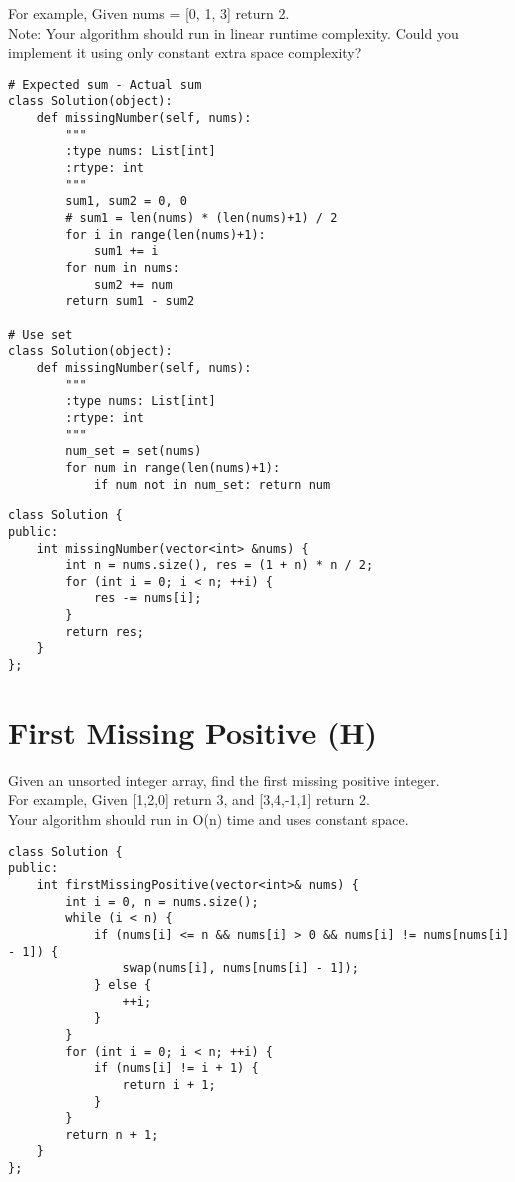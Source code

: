 For example, 
Given nums = [0, 1, 3] return 2.\\

Note:
Your algorithm should run in linear runtime complexity. Could you implement it using only constant extra space complexity? \\

\begin{lstlisting}
# Expected sum - Actual sum
class Solution(object):
    def missingNumber(self, nums):
        """
        :type nums: List[int]
        :rtype: int
        """
        sum1, sum2 = 0, 0
        # sum1 = len(nums) * (len(nums)+1) / 2
        for i in range(len(nums)+1):
            sum1 += i
        for num in nums:
            sum2 += num
        return sum1 - sum2

# Use set
class Solution(object):
    def missingNumber(self, nums):
        """
        :type nums: List[int]
        :rtype: int
        """
        num_set = set(nums)
        for num in range(len(nums)+1):
            if num not in num_set: return num
\end{lstlisting}        

\begin{lstlisting}
class Solution {
public:
    int missingNumber(vector<int> &nums) {
        int n = nums.size(), res = (1 + n) * n / 2;
        for (int i = 0; i < n; ++i) {
            res -= nums[i];
        }
        return res;
    }
};
\end{lstlisting}


\section{First Missing Positive (H)}
Given an unsorted integer array, find the first missing positive integer.\\

For example,
Given [1,2,0] return 3,
and [3,4,-1,1] return 2.\\

Your algorithm should run in O(n) time and uses constant space. \\

\begin{lstlisting}
class Solution {
public:
    int firstMissingPositive(vector<int>& nums) {
        int i = 0, n = nums.size();
        while (i < n) {
            if (nums[i] <= n && nums[i] > 0 && nums[i] != nums[nums[i] - 1]) {
                swap(nums[i], nums[nums[i] - 1]);
            } else {
                ++i;
            }
        }
        for (int i = 0; i < n; ++i) {
            if (nums[i] != i + 1) {
                return i + 1;
            }
        }
        return n + 1;
    }
};
\end{lstlisting}


